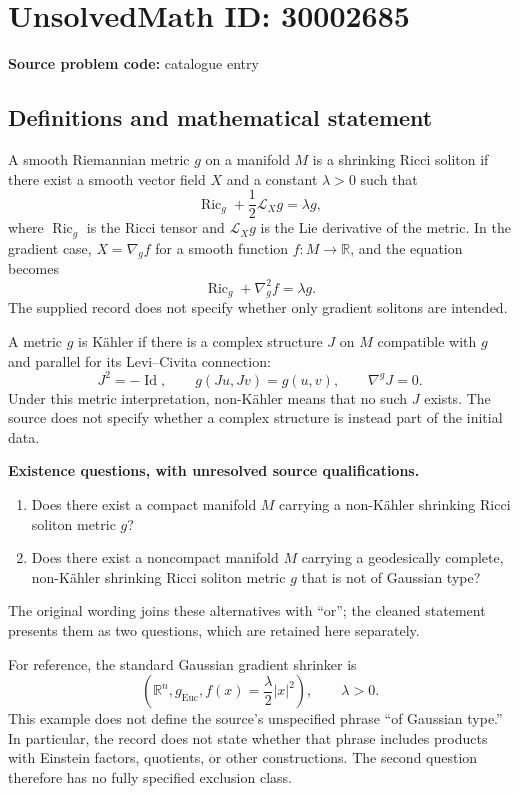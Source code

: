 \documentclass[11pt]{article}
\newcommand{\R}{\mathbb{R}}
\begin{document}
\section*{UnsolvedMath ID: 30002685}
\textbf{Source problem code:} catalogue entry
\subsection{Definitions and mathematical statement}
A smooth Riemannian metric \(g\) on a manifold \(M\) is a shrinking Ricci soliton if there exist a smooth vector field \(X\) and a constant \(\lambda>0\) such that
\[
\operatorname{Ric}_g+\frac12\mathcal L_Xg=\lambda g,
\]
where \(\operatorname{Ric}_g\) is the Ricci tensor and \(\mathcal L_Xg\) is the Lie derivative of the metric. In the gradient case, \(X=\nabla_g f\) for a smooth function \(f:M\to\R\), and the equation becomes
\[
\operatorname{Ric}_g+\nabla_g^2 f=\lambda g.
\]
The supplied record does not specify whether only gradient solitons are intended.

A metric \(g\) is K\"ahler if there is a complex structure \(J\) on \(M\) compatible with \(g\) and parallel for its Levi--Civita connection:
\[
J^2=-\operatorname{Id},\qquad g(Ju,Jv)=g(u,v),\qquad \nabla^gJ=0.
\]
Under this metric interpretation, non-K\"ahler means that no such \(J\) exists. The source does not specify whether a complex structure is instead part of the initial data.

\textbf{Existence questions, with unresolved source qualifications.}
\begin{enumerate}
\item Does there exist a compact manifold \(M\) carrying a non-K\"ahler shrinking Ricci soliton metric \(g\)?
\item Does there exist a noncompact manifold \(M\) carrying a geodesically complete, non-K\"ahler shrinking Ricci soliton metric \(g\) that is not of Gaussian type?
\end{enumerate}
The original wording joins these alternatives with ``or''; the cleaned statement presents them as two questions, which are retained here separately.

For reference, the standard Gaussian gradient shrinker is
\[
\left(\R^n,g_{\mathrm{Euc}},f(x)=\frac{\lambda}{2}|x|^2\right),\qquad \lambda>0.
\]
This example does not define the source's unspecified phrase ``of Gaussian type.'' In particular, the record does not state whether that phrase includes products with Einstein factors, quotients, or other constructions. The second question therefore has no fully specified exclusion class.
\end{document}
